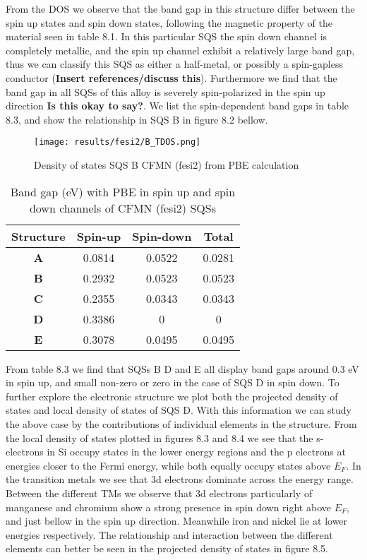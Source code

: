 From the DOS we observe that the band gap in this structure differ between the spin up states and spin down states, following the magnetic property of the material seen in table 8.1. In this particular SQS the spin down channel is completely metallic, and the spin up channel exhibit a relatively large band gap, thus we can classify this SQS as either a half-metal, or possibly a spin-gapless conductor (\textbf{Insert references/discuss this}). Furthermore we find that the band gap in all SQSs of this alloy is severely spin-polarized in the spin up direction \textbf{Is this okay to say?}. We list the spin-dependent band gaps in table 8.3, and show the relationship in SQS B in figure 8.2 bellow.

\begin{figure}[H]
	\texttt{[image: results/fesi2/B\_TDOS.png]}
	\caption{Density of states SQS B CFMN (fesi2) from PBE calculation}
\end{figure}

\begin{table}[H]
\centering
\begin{tabular}{@{}cccc@{}}
\toprule
Structure  & Spin-up & Spin-down & Total  \\ \midrule
\textbf{A} & 0.0814  & 0.0522    & 0.0281 \\
\textbf{B} & 0.2932  & 0.0523    & 0.0523 \\
\textbf{C} & 0.2355  & 0.0343    & 0.0343 \\
\textbf{D} & 0.3386  & 0         & 0      \\
\textbf{E} & 0.3078  & 0.0495    & 0.0495 \\ \bottomrule
\end{tabular}
\caption{Band gap (eV) with PBE in spin up and spin down channels of CFMN (fesi2) SQSs}
\end{table}

From table 8.3 we find that SQSs B D and E all display band gaps around 0.3 eV in spin up, and small non-zero or zero in the case of SQS D in spin down. To further explore the electronic structure we plot both the projected density of states and local density of states of SQS D. With this information we can study the above case by the contributions of individual elements in the structure. From the local density of states plotted in figures 8.3 and 8.4 we see that the s-electrons in Si occupy states in the lower energy regions and the p electrons at energies closer to the Fermi energy, while both equally occupy states above $E_F$. In the transition metals we see that 3d electrons dominate across the energy range. Between the different TMs we observe that 3d electrons particularly of manganese and chromium show a strong presence in spin down right above $E_F$, and just bellow in the spin up direction. Meanwhile iron and nickel lie at lower energies respectively. The relationship and interaction between the different elements can better be seen in the projected density of states in figure 8.5. 

